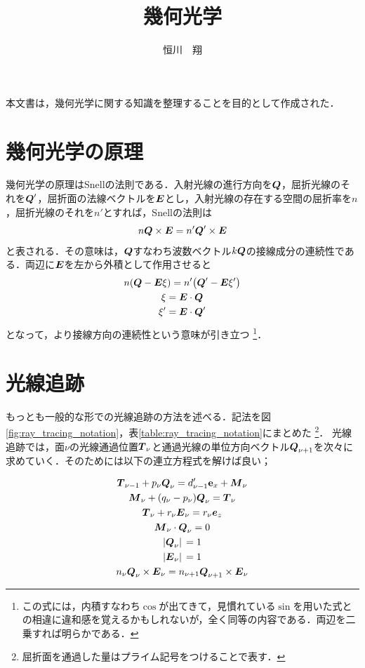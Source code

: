 \documentclass{jsarticle}
\begin{document}
\title{幾何光学}
\author{恒川　翔}
\maketitle
本文書は，幾何光学に関する知識を整理することを目的として作成された．

\tableofcontents

\newpage

\section{幾何光学の原理}
\label{sec:principle}
幾何光学の原理はSnellの法則である．入射光線の進行方向を$\vb*{Q}$，屈折光線のそれを$\vb*{Q}'$，屈折面の法線ベクトルを$\vb*{E}$とし，入射光線の存在する空間の屈折率を$n$，屈折光線のそれを$n'$とすれば，Snellの法則は
\begin{equation}
    n\vb*{Q}\times\vb*{E}=n'\vb*{Q}'\times\vb*{E}
\end{equation}
と表される．その意味は，$\vb*{Q}$すなわち波数ベクトル$k\vb*{Q}$の接線成分の連続性である．両辺に$\vb*{E}$を左から外積として作用させると
\begin{gather}
    n\qty(\vb*{Q}-\vb*{E}\xi)=n'\qty(\vb*{Q}'-\vb*{E}\xi')\\
    \xi=\vb*{E}\cdot\vb*{Q}\\
    \xi'=\vb*{E}\cdot\vb*{Q}'
\end{gather}
となって，より接線方向の連続性という意味が引き立つ
\footnote{
    この式には，内積すなわち$\cos$が出てきて，見慣れている$\sin$を用いた式との相違に違和感を覚えるかもしれないが，全く同等の内容である．両辺を二乗すれば明らかである．
}．

\section{光線追跡}
\label{sec:ray_tracing}
もっとも一般的な形での光線追跡の方法を述べる．記法を図\ref{fig:ray_tracing_notation}，表\ref{table:ray_tracing_notation}にまとめた
\footnote{
    屈折面を通過した量はプライム記号をつけることで表す．
}．
光線追跡では，面$\nu$の光線通過位置$\vb*{T}_{\nu}$と通過光線の単位方向ベクトル$\vb*{Q}_{\nu+1}$を次々に求めていく．そのためには以下の連立方程式を解けば良い；

\begin{gather}
    \vb*{T}_{\nu-1}+p_\nu\vb*{Q}_\nu=d_{\nu-1}'\vb{e}_x+\vb*{M}_\nu
    \label{eq:ray_tracing_1}\\
    \vb*{M}_\nu+(q_\nu-p_\nu)\vb*{Q}_\nu=\vb*{T}_\nu
    \label{eq:ray_tracing_2}\\
    \vb*{T}_\nu+r_\nu\vb*{E}_\nu=r_\nu\vb*{e}_z
    \label{eq:ray_tracing_3}\\
    \vb*{M}_\nu\cdot\vb*{Q}_\nu=0
    \label{eq:ray_tracing_4}\\
    \abs*{\vb*{Q}_\nu}=1
    \label{eq:ray_tracing_5}\\
    \abs*{\vb*{E}_\nu}=1
    \label{eq:ray_tracing_6}\\
    n_\nu\vb*{Q}_\nu\times\vb*{E}_\nu=n_{\nu+1}\vb*{Q}_{\nu+1}\times\vb*{E}_{\nu}
    \label{eq:ray_tracing_7}
\end{gather}
\end{document}
